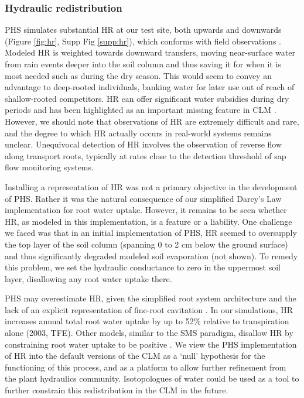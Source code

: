 \documentclass[draft,linenumbers]{agujournal}
\begin{document}
\subsubsection{Hydraulic redistribution}
PHS simulates substantial HR at our test site, both upwards and downwards (Figure \ref{fig:hr}, Supp Fig \ref{supp:hr}), which conforms with field observations \citep{burgess1998,oliveira2005}.
    Modeled HR is weighted towards downward transfers, moving near-surface water from rain events deeper into the soil column and thus saving it for when it is most needed such as during the dry season.
    This would seem to convey an advantage to deep-rooted individuals, banking water for later use out of reach of shallow-rooted competitors.
    HR can offer significant water subsidies during dry periods \citep{jackson2000} and has been highlighted as an important missing feature in CLM \citep{lee2005}. 
    However, we should note that observations of HR are extremely difficult and rare, and the degree to which HR actually occurs in real-world systems remains unclear. 
    Unequivocal detection of HR involves the observation of reverse flow along transport roots, typically at rates close to the detection threshold of sap flow monitoring systems. 
    
    Installing a representation of HR was not a primary objective in the development of PHS.
    Rather it was the natural consequence of our simplified Darcy's Law implementation for root water uptake.
    However, it remains to be seen whether HR, as modeled in this implementation, is a feature or a liability.
    One challenge we faced was that in an initial implementation of PHS, HR seemed to oversupply the top layer of the soil column (spanning 0 to 2 cm below the ground surface) and thus significantly degraded modeled soil evaporation (not shown). 
    To remedy this problem, we set the hydraulic conductance to zero in the uppermost soil layer, disallowing any root water uptake there.
    
    PHS may overestimate HR, given the simplified root system architecture \citep{bouda2017} 
    and the lack of an explicit representation of fine-root cavitation \citep{kotowska2015}.
    In our simulations, HR increases annual total root water uptake by up to 52\% relative to transpiration alone (2003, TFE). 
    Other models, similar to the SMS paradigm, disallow HR by constraining root water uptake to be positive \citep{xu2016}.
    We view the PHS implementation of HR into the default versions of the CLM as a `null' hypothesis for the functioning of this process, and as a platform to allow further refinement from the plant hydraulics community. 
    Isotopologues of water could be used as a tool to further constrain this redistribution in the CLM in the future. 
\end{document}
